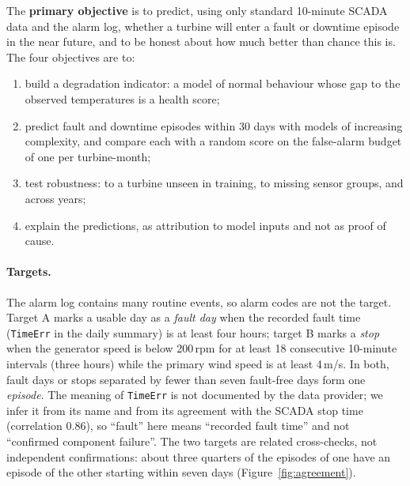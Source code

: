 \documentclass[12pt,a4paper]{article}
\begin{document}
	The \textbf{primary objective} is to predict, using only standard 10-minute SCADA data and the alarm log, whether a turbine will enter a fault or downtime episode in the near future, and to be honest about how much better than chance this is. The four objectives are to:
	\begin{enumerate}[label=\textbf{O\arabic*}]
		\item build a degradation indicator: a model of normal behaviour whose gap to the observed temperatures is a health score;
		\item predict fault and downtime episodes within 30 days with models of increasing complexity, and compare each with a random score on the false-alarm budget of one per turbine-month;
		\item test robustness: to a turbine unseen in training, to missing sensor groups, and across years;
		\item explain the predictions, as attribution to model inputs and not as proof of cause.
	\end{enumerate}

	\paragraph{Targets.} The alarm log contains many routine events, so alarm codes are not the target. Target A marks a usable day as a \emph{fault day} when the recorded fault time (\texttt{TimeErr} in the daily summary) is at least four hours; target B marks a \emph{stop} when the generator speed is below 200\,rpm for at least 18 consecutive 10-minute intervals (three hours) while the primary wind speed is at least 4\,m/s. In both, fault days or stops separated by fewer than seven fault-free days form one \emph{episode}. The meaning of \texttt{TimeErr} is not documented by the data provider; we infer it from its name and from its agreement with the SCADA stop time (correlation 0.86), so ``fault'' here means ``recorded fault time'' and not ``confirmed component failure''. The two targets are related cross-checks, not independent confirmations: about three quarters of the episodes of one have an episode of the other starting within seven days (Figure~\ref{fig:agreement}).
\end{document}

